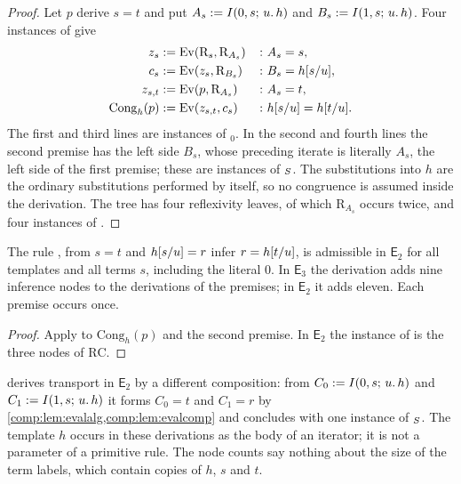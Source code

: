 \begin{proof}
Let $p$ derive $s=t$ and put $A_s\mathrel{:=}I(0,s;\,u.\,h)$ and
$B_s\mathrel{:=}I(1,s;\,u.\,h)$. Four instances of  give
\begin{align*}
 z_s&\mathrel{:=}\mathrm{Ev}(\mathrm{R}_s,\mathrm{R}_{A_s}) &&\colon A_s=s,\\
 c_s&\mathrel{:=}\mathrm{Ev}(z_s,\mathrm{R}_{B_s}) &&\colon B_s=h[s/u],\\
 z_{s,t}&\mathrel{:=}\mathrm{Ev}(p,\mathrm{R}_{A_s}) &&\colon A_s=t,\\
 \mathrm{Cong}_h(p)&\mathrel{:=}\mathrm{Ev}(z_{s,t},c_s)
   &&\colon h[s/u]=h[t/u].
\end{align*}
The first and third lines are instances of $_0$. In the
second and fourth lines the second premise has the left side $B_s$, whose
preceding iterate is literally $A_s$, the left side of the first premise;
these are instances of $_{S}$. The substitutions into $h$
are the ordinary substitutions performed by  itself, so no
congruence is assumed inside the derivation. The tree has four reflexivity
leaves, of which $\mathrm{R}_{A_s}$ occurs twice, and four instances of
.
\end{proof}

\begin{corollary}[Transport]
\label{comp:cor:evaltr}
The rule , from $s=t$ and $h[s/u]=r$ infer
$r=h[t/u]$, is admissible in $\mathsf{E}_2$ for all templates and all
terms $s$, including the literal $0$. In $\mathsf{E}_3$ the derivation adds
nine inference nodes to the derivations of the premises; in $\mathsf{E}_2$
it adds eleven. Each premise occurs once.
\end{corollary}

\begin{proof}
Apply  to $\mathrm{Cong}_h(p)$ and the second premise. In
$\mathsf{E}_2$ the instance of  is the three nodes of
$\mathrm{RC}$.
\end{proof}

\begin{remark}
 derives transport in $\mathsf{E}_2$ by a
different composition: from $C_0\mathrel{:=}I(0,s;\,u.\,h)$ and
$C_1\mathrel{:=}I(1,s;\,u.\,h)$ it forms $C_0=t$ and $C_1=r$ by
\cref{comp:lem:evalalg,comp:lem:evalcomp} and concludes with one instance of
$_{S}$. The template $h$ occurs in these derivations as
the body of an iterator; it is not a parameter of a primitive rule. The node
counts say nothing about the size of the term labels, which contain copies
of $h$, $s$ and $t$.
\end{remark}

